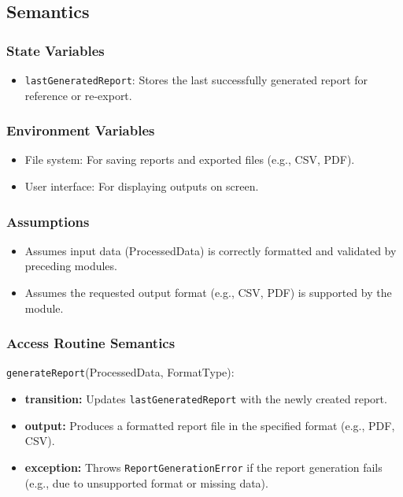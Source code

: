 \documentclass[12pt, titlepage]{article}
\begin{document}
\subsection{Semantics}

\subsubsection{State Variables}

\begin{itemize}
    \item \texttt{lastGeneratedReport}: Stores the last successfully generated report for reference or re-export.
\end{itemize}

\subsubsection{Environment Variables}

\begin{itemize}
    \item File system: For saving reports and exported files (e.g., CSV, PDF).
    \item User interface: For displaying outputs on screen.
\end{itemize}

\subsubsection{Assumptions}

\begin{itemize}
    \item Assumes input data (ProcessedData) is correctly formatted and validated by preceding modules.
    \item Assumes the requested output format (e.g., CSV, PDF) is supported by the module.
\end{itemize}

\subsubsection{Access Routine Semantics}

\noindent \texttt{generateReport}(ProcessedData, FormatType):
\begin{itemize}
    \item \textbf{transition:} Updates \texttt{lastGeneratedReport} with the newly created report.
    \item \textbf{output:} Produces a formatted report file in the specified format (e.g., PDF, CSV).
    \item \textbf{exception:} Throws \texttt{ReportGenerationError} if the report generation fails (e.g., due to unsupported format or missing data).
\end{itemize}
\end{document}
